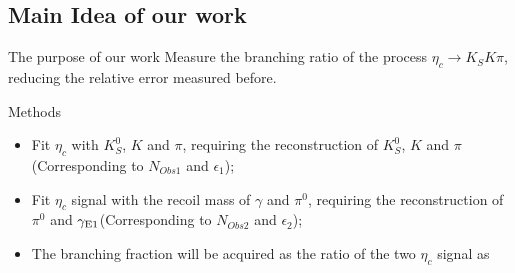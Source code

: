 \documentclass{beamer}
\begin{document}
\subsection{Main Idea of our work}
\begin{frame}
\begin{block}{The purpose of our work}
Measure the branching ratio of the process ${\eta}_c\rightarrow K_S K \pi$, reducing the relative error measured before.\\
\end{block}
\begin{block}{Methods}
\begin{itemize}
\item Fit ${\eta}_c$ with $K_S^0$, $K$ and $\pi$, requiring the reconstruction of $K_S^0$, $K$ and $\pi$(Corresponding to $N_{Obs1}$ and ${\epsilon}_1$);
\item Fit ${\eta}_c$ signal with the recoil mass of $\gamma$ and ${\pi}^0$, requiring the reconstruction of ${\pi}^0$ and ${\gamma}_{\rm E1}$(Corresponding to $N_{Obs2}$ and ${\epsilon}_2$);
\item The branching fraction will be acquired as the ratio of the two ${\eta}_c$ signal as
\begin{center}
\end{center}
\end{itemize}
\end{block}
\end{frame}

\end{document}
